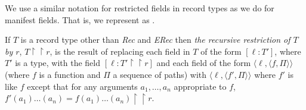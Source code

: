 \begin{shaded}
\begin{ex}
\begin{subex}
 
\item
  \begin{prooftree}
  \end{prooftree}
  
  \begin{prooftree}
  \end{prooftree}
  \hspace*{2em}
  \begin{prooftree}
  \end{prooftree}
  \hspace*{2em}
  \begin{prooftree}
  \end{prooftree}
  
 
\end{subex} 
   
\end{ex} 
  
We use a similar notation for restricted fields in record types as we
do for manifest fields.  That is, we represent  as
.
\begin{ex} 
\begin{subex} 
 
\item {} 
 
\item {} 
 
\end{subex} 
   
\end{ex}

If $T$ is a record type other than \textit{Rec} and \textit{ERec} then
\textit{the recursive restriction of $T$ by $r$},
$T\!\restriction\restriction\!r$, is the result of replacing each
field in $T$ of the form $[\ell:T']$, where $T'$ is a type, with the
field $[\ell:T'\!\restriction\restriction\!r]$ and each field of the
form $\langle\ell,\langle f,\Pi\rangle\rangle$ (where $f$ is a
function and $\Pi$ a sequence of paths) with $\langle\ell,\langle
f',\Pi\rangle\rangle$ where $f'$ is like $f$ except that for any
arguments $a_1,\ldots,a_n$ appropriate to $f$,
$f'(a_1)\ldots(a_n)=f(a_1)\ldots(a_n)\!\restriction\restriction r$.


\end{shaded}
